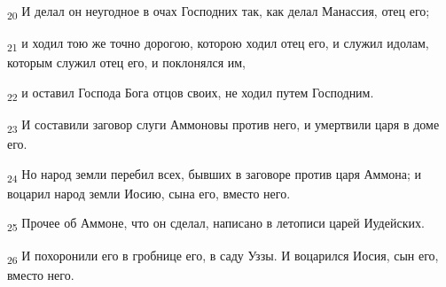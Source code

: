 \begin{tcolorbox}
\textsubscript{20} И делал он неугодное в очах Господних так, как делал Манассия, отец его;
\end{tcolorbox}
\begin{tcolorbox}
\textsubscript{21} и ходил тою же точно дорогою, которою ходил отец его, и служил идолам, которым служил отец его, и поклонялся им,
\end{tcolorbox}
\begin{tcolorbox}
\textsubscript{22} и оставил Господа Бога отцов своих, не ходил путем Господним.
\end{tcolorbox}
\begin{tcolorbox}
\textsubscript{23} И составили заговор слуги Аммоновы против него, и умертвили царя в доме его.
\end{tcolorbox}
\begin{tcolorbox}
\textsubscript{24} Но народ земли перебил всех, бывших в заговоре против царя Аммона; и воцарил народ земли Иосию, сына его, вместо него.
\end{tcolorbox}
\begin{tcolorbox}
\textsubscript{25} Прочее об Аммоне, что он сделал, написано в летописи царей Иудейских.
\end{tcolorbox}
\begin{tcolorbox}
\textsubscript{26} И похоронили его в гробнице его, в саду Уззы. И воцарился Иосия, сын его, вместо него.
\end{tcolorbox}
